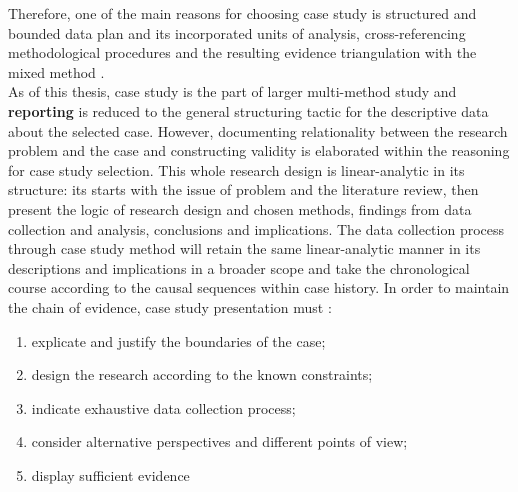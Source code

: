 \documentclass[11pt]{report}
\begin{document}
Therefore, one of the main reasons for choosing case study is structured and bounded data plan and its incorporated units of analysis, cross-referencing methodological procedures and the resulting evidence triangulation with the mixed method .
\\
As of this thesis, case study is the part of larger multi-method study and \textbf{reporting} is reduced to the general structuring tactic for 
the descriptive data about the selected case. However, documenting relationality between the research problem and the case and constructing validity is elaborated within the reasoning for case study selection. This whole research design is linear-analytic in its structure: its starts with the issue of problem and the literature review, then present the logic of research design and  chosen methods, findings from data collection and analysis, conclusions and implications. The data collection process through case study method will retain the same linear-analytic manner in its descriptions and implications in a broader scope and take the chronological course according to the causal sequences within case history. In order to maintain the chain of evidence, case study presentation must :
\begin{enumerate}
\item explicate and justify the boundaries of the case;
\item design the research according to the known constraints;
\item indicate exhaustive data collection process;
\item consider alternative perspectives and different points of view;
\item display sufficient evidence
\end{enumerate}
\end{document}
